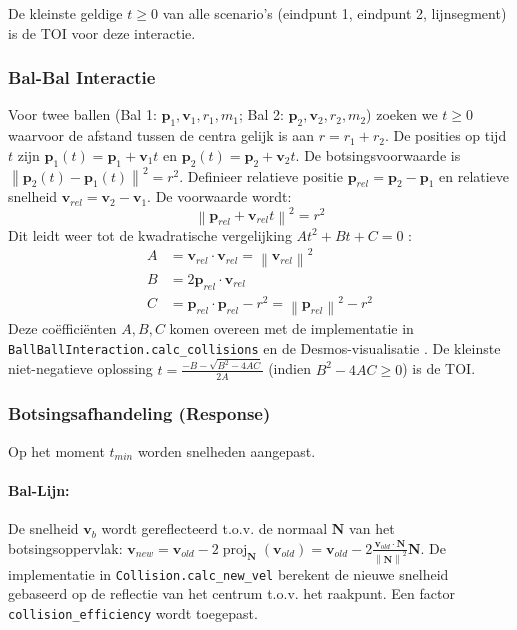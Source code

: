 \documentclass[11pt, a4paper]{article}
\newcommand{\vect}[1]{\mathbf{#1}}      %
\newcommand{\norm}[1]{\left\lVert#1\right\rVert} %
\begin{document}
De kleinste geldige $t \ge 0$ van alle scenario's (eindpunt 1, eindpunt 2, lijnsegment) is de TOI voor deze interactie.

\subsubsection{Bal-Bal Interactie}
Voor twee ballen (Bal 1: $\vect{p}_1, \vect{v}_1, r_1, m_1$; Bal 2: $\vect{p}_2, \vect{v}_2, r_2, m_2$) zoeken we $t \ge 0$ waarvoor de afstand tussen de centra gelijk is aan $r = r_1 + r_2$. De posities op tijd $t$ zijn $\vect{p}_1(t) = \vect{p}_1 + \vect{v}_1 t$ en $\vect{p}_2(t) = \vect{p}_2 + \vect{v}_2 t$.
De botsingsvoorwaarde is $\norm{\vect{p}_2(t) - \vect{p}_1(t)}^2 = r^2$.
Definieer relatieve positie $\vect{p}_{rel} = \vect{p}_2 - \vect{p}_1$ en relatieve snelheid $\vect{v}_{rel} = \vect{v}_2 - \vect{v}_1$. De voorwaarde wordt:
\[ \norm{\vect{p}_{rel} + \vect{v}_{rel} t}^2 = r^2 \]
Dit leidt weer tot de kwadratische vergelijking $At^2 + Bt + C = 0$ \parencite{ToptalPhysics, LeongCircleCircle, DesmosBallBall}:
\begin{align*}
    A &= \vect{v}_{rel} \cdot \vect{v}_{rel} = \norm{\vect{v}_{rel}}^2 \\
    B &= 2 \vect{p}_{rel} \cdot \vect{v}_{rel} \\
    C &= \vect{p}_{rel} \cdot \vect{p}_{rel} - r^2 = \norm{\vect{p}_{rel}}^2 - r^2
\end{align*}
Deze coëfficiënten $A, B, C$ komen overeen met de implementatie in \texttt{BallBallInteraction.calc\_collisions} en de Desmos-visualisatie \parencite{DesmosBallBall}. De kleinste niet-negatieve oplossing $t = \frac{-B - \sqrt{B^2 - 4AC}}{2A}$ (indien $B^2 - 4AC \ge 0$) is de TOI.

\subsubsection{Botsingsafhandeling (Response)}
Op het moment $t_{min}$ worden snelheden aangepast.
\paragraph{Bal-Lijn:} De snelheid $\vect{v}_b$ wordt gereflecteerd t.o.v. de normaal $\vect{N}$ van het botsingsoppervlak: $\vect{v}_{new} = \vect{v}_{old} - 2 \operatorname{proj}_{\vect{N}}(\vect{v}_{old}) = \vect{v}_{old} - 2 \frac{\vect{v}_{old} \cdot \vect{N}}{\norm{\vect{N}}^2} \vect{N}$. De implementatie in \texttt{Collision.calc\_new\_vel} berekent de nieuwe snelheid gebaseerd op de reflectie van het centrum t.o.v. het raakpunt. Een factor \texttt{collision\_efficiency} wordt toegepast.
\end{document}
